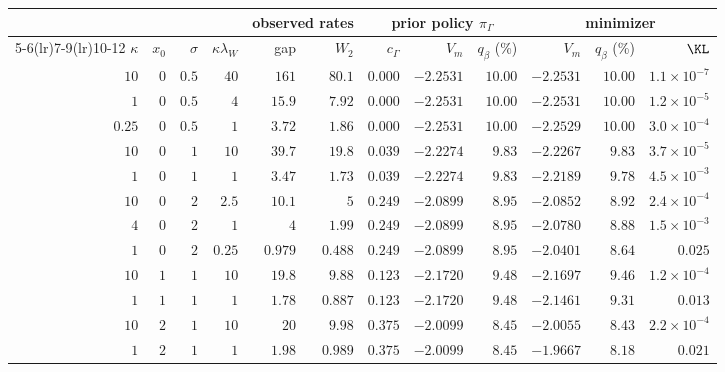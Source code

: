 \setlength{\tabcolsep}{3.5pt}\begin{tabular}{rrrrrrrrrrrr}
\toprule
 & & & & \multicolumn{2}{c}{observed rates} & \multicolumn{3}{c}{prior policy $\pi_\Gamma$} & \multicolumn{3}{c}{minimizer} \\
\cmidrule(lr){5-6}\cmidrule(lr){7-9}\cmidrule(lr){10-12}
$\kappa$ & $x_0$ & $\sigma$ & $\kappa\lambda_W$ & gap & $W_2$ & $c_\Gamma$ & $V_m$ & $q_\beta$ (\%) & $V_m$ & $q_\beta$ (\%) & $\KL$ \\
\midrule
$10$ & $0$ & $0.5$ & $40$ & $161$ & $80.1$ & $0.000$ & $-2.2531$ & $10.00$ & $-2.2531$ & $10.00$ & $1.1\times10^{-7}$ \\
$1$ & $0$ & $0.5$ & $4$ & $15.9$ & $7.92$ & $0.000$ & $-2.2531$ & $10.00$ & $-2.2531$ & $10.00$ & $1.2\times10^{-5}$ \\
$0.25$ & $0$ & $0.5$ & $1$ & $3.72$ & $1.86$ & $0.000$ & $-2.2531$ & $10.00$ & $-2.2529$ & $10.00$ & $3.0\times10^{-4}$ \\
$10$ & $0$ & $1$ & $10$ & $39.7$ & $19.8$ & $0.039$ & $-2.2274$ & $9.83$ & $-2.2267$ & $9.83$ & $3.7\times10^{-5}$ \\
$1$ & $0$ & $1$ & $1$ & $3.47$ & $1.73$ & $0.039$ & $-2.2274$ & $9.83$ & $-2.2189$ & $9.78$ & $4.5\times10^{-3}$ \\
$10$ & $0$ & $2$ & $2.5$ & $10.1$ & $5$ & $0.249$ & $-2.0899$ & $8.95$ & $-2.0852$ & $8.92$ & $2.4\times10^{-4}$ \\
$4$ & $0$ & $2$ & $1$ & $4$ & $1.99$ & $0.249$ & $-2.0899$ & $8.95$ & $-2.0780$ & $8.88$ & $1.5\times10^{-3}$ \\
$1$ & $0$ & $2$ & $0.25$ & $0.979$ & $0.488$ & $0.249$ & $-2.0899$ & $8.95$ & $-2.0401$ & $8.64$ & $0.025$ \\
$10$ & $1$ & $1$ & $10$ & $19.8$ & $9.88$ & $0.123$ & $-2.1720$ & $9.48$ & $-2.1697$ & $9.46$ & $1.2\times10^{-4}$ \\
$1$ & $1$ & $1$ & $1$ & $1.78$ & $0.887$ & $0.123$ & $-2.1720$ & $9.48$ & $-2.1461$ & $9.31$ & $0.013$ \\
$10$ & $2$ & $1$ & $10$ & $20$ & $9.98$ & $0.375$ & $-2.0099$ & $8.45$ & $-2.0055$ & $8.43$ & $2.2\times10^{-4}$ \\
$1$ & $2$ & $1$ & $1$ & $1.98$ & $0.989$ & $0.375$ & $-2.0099$ & $8.45$ & $-1.9667$ & $8.18$ & $0.021$ \\
\bottomrule
\end{tabular}
